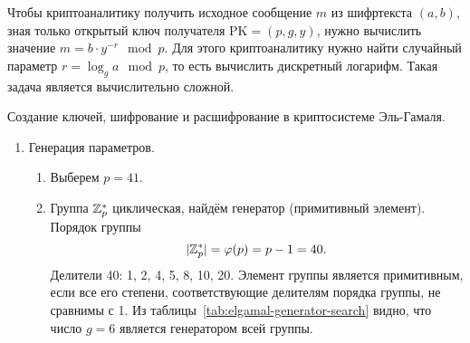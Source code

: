 Чтобы криптоаналитику получить исходное сообщение $m$ из шифртекста $(a, b)$, зная только открытый ключ получателя $\text{PK} = (p, g, y)$, нужно вычислить значение $m = b \cdot y^{-r} \mod p$. Для этого криптоаналитику нужно найти случайный параметр $r = \log_g a \mod p$, то есть вычислить дискретный логарифм. Такая задача является вычислительно сложной.

\example Создание ключей, шифрование и расшифрование в криптосистеме Эль-Гамаля.

\begin{enumerate}
    \item Генерация параметров.
        \begin{enumerate}
            \item Выберем $p=41$.
            \item Группа $\mathbb{Z}_p^*$ циклическая, найдём генератор (примитивный элемент). Порядок группы
                \[ |\mathbb{Z}_p^*| = \varphi(p) = p-1 = 40. \]
                Делители 40: 1, 2, 4, 5, 8, 10, 20. Элемент группы является примитивным, если все его степени, соответствующие делителям порядка группы, не сравнимы с 1. Из таблицы~\ref{tab:elgamal-generator-search} видно, что число $g = 6$ является генератором всей группы.
                \begin{table}[!ht]
                    \centering
                    \caption{Поиск генератора в циклической группе $\Z_{41}^*$. Элемент 6 -- генератор\label{tab:elgamal-generator-search}}
\end{table}
\end{enumerate}
\end{enumerate}
